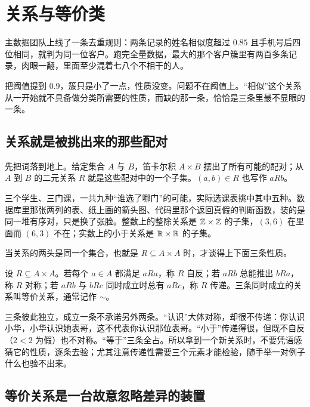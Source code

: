 \section{关系与等价类}
\label{sec:01-Mathematical-Language/02-Sets-Relations-Functions/02}

主数据团队上线了一条去重规则：两条记录的姓名相似度超过 \(0.85\) 且手机号后四位相同，就判为同一位客户。跑完全量数据，最大的那个客户簇里有两百多条记录，肉眼一翻，里面至少混着七八个不相干的人。

把阈值提到 \(0.9\)，簇只是小了一点，性质没变。问题不在阈值上。``相似''这个关系从一开始就不具备做分类所需要的性质，而缺的那一条，恰恰是三条里最不显眼的一条。

\subsection{关系就是被挑出来的那些配对}

先把词落到地上。给定集合 \(A\) 与 \(B\)，笛卡尔积 \(A\times B\) 摆出了所有可能的配对；从 \(A\) 到 \(B\) 的二元关系 \(R\) 就是这些配对中的一个子集。\((a,b)\in R\) 也写作 \(aRb\)。

三个学生、三门课，一共九种``谁选了哪门''的可能，实际选课表挑中其中五种。数据库里那张两列的表、纸上画的箭头图、代码里那个返回真假的判断函数，装的是同一堆有序对，只是换了张脸。整数上的整除关系是 \(\mathbb{Z}\times\mathbb{Z}\) 的子集，\((3,6)\) 在里面而 \((6,3)\) 不在；实数上的小于关系是 \(\mathbb{R}\times\mathbb{R}\) 的子集。

当关系的两头是同一个集合，也就是 \(R\subseteq A\times A\) 时，才谈得上下面三条性质。

\begin{definition}
设 \(R\subseteq A\times A\)。若每个 \(a\in A\) 都满足 \(aRa\)，称 \(R\) 自反；若 \(aRb\) 总能推出 \(bRa\)，称 \(R\) 对称；若 \(aRb\) 与 \(bRc\) 同时成立时总有 \(aRc\)，称 \(R\) 传递。三条同时成立的关系叫等价关系，通常记作 \(\sim\)。
\end{definition}

三条彼此独立，成立一条不承诺另外两条。``认识''大体对称，却很不传递：你认识小华，小华认识她表哥，这不代表你认识那位表哥。``小于''传递得很，但既不自反（\(2<2\) 为假）也不对称。``等于''三条全占。所以拿到一个新关系时，不要凭语感猜它的性质，逐条去验；尤其注意传递性需要三个元素才能检验，随手举一对例子什么也验不出来。

\subsection{等价关系是一台故意忽略差异的装置}

